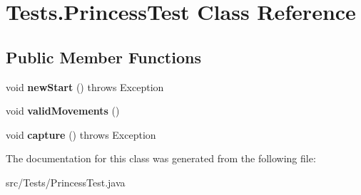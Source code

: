 \hypertarget{class_tests_1_1_princess_test}{}\section{Tests.\+Princess\+Test Class Reference}
\label{class_tests_1_1_princess_test}
\subsection*{Public Member Functions}
\begin{DoxyCompactItemize}
\item 
\mbox{\label{class_tests_1_1_princess_test_a6137376a6c9cf152c577321aed3b226b}} 
void {\bfseries new\+Start} ()  throws Exception
\item 
\mbox{\label{class_tests_1_1_princess_test_a8b8d640cd45ca2781f961e2a2773beac}} 
void {\bfseries valid\+Movements} ()
\item 
\mbox{\label{class_tests_1_1_princess_test_a5685f4f37bb3c38bcb5cf581c3224f5f}} 
void {\bfseries capture} ()  throws Exception 
\end{DoxyCompactItemize}


The documentation for this class was generated from the following file\+:\begin{DoxyCompactItemize}
\item 
src/\+Tests/Princess\+Test.\+java\end{DoxyCompactItemize}
